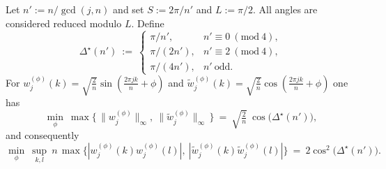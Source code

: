 \documentclass[10pt,a4paper]{amsart}
\begin{document}
\begin{lem}\label{lem:twophase}
Let $n':=n/\gcd(j,n)$ and set $S:=2\pi/n'$ and $L:=\pi/2$. All angles are considered reduced modulo $L$. Define
\[
\Delta^\star(n')\ :=\
\begin{cases}
\pi/n',     & n'\equiv 0\ (\mathrm{mod}\ 4),\\[1mm]
\pi/(2n'),  & n'\equiv 2\ (\mathrm{mod}\ 4),\\[1mm]
\pi/(4n'),  & n'\ \mathrm{odd}.
\end{cases}
\]
For $w^{(\phi)}_j(k)=\sqrt{\tfrac{2}{n}}\sin(\tfrac{2\pi jk}{n}+\phi)$ and
$\tilde w^{(\phi)}_j(k)=\sqrt{\tfrac{2}{n}}\cos(\tfrac{2\pi jk}{n}+\phi)$ one has
\[
\min_{\phi}\ \max\!\Big\{\,\|w^{(\phi)}_j\|_\infty,\ \|\tilde w^{(\phi)}_j\|_\infty\,\Big\}
\ =\ \sqrt{\tfrac2n}\ \cos\big(\Delta^\star(n')\big),
\]
and consequently
\[
\min_{\phi}\ \sup_{k,l}\ n\,\max\{|w^{(\phi)}_j(k)w^{(\phi)}_j(l)|,\ |\tilde w^{(\phi)}_j(k)\tilde w^{(\phi)}_j(l)|\}
\ =\ 2\cos^2\big(\Delta^\star(n')\big).
\]
\end{lem}
\end{document}

